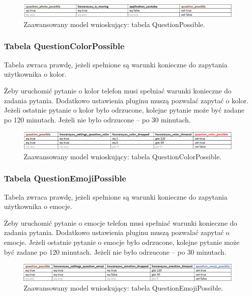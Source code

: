\begin{figure}[H]
	\centering
	\includegraphics[scale=0.75]{rozdzial4/HMR_QuestionPossible.png}
	\caption{Zaawansowany model wnioskujący: tabela QuestionPossible.}
\end{figure}


\subsubsection{Tabela QuestionColorPossible}

Tabela zwraca prawdę, jeżeli spełnione są warunki konieczne do zapytania użytkownika o kolor.

Żeby uruchomić pytanie o kolor telefon musi spełniać warunki konieczne do zadania pytania. Dodatkowo ustawienia pluginu muszą pozwalać zapytać o kolor. Jeżeli ostatnie pytanie o kolor było odrzucone, kolejne pytanie może być zadane po 120 minutach. Jeżeli nie było odrzucone – po 30 minutach.

\begin{figure}[H]
	\centering
	\includegraphics[scale=0.75]{rozdzial4/HMR_QuestionColorPossible.png}
	\caption{Zaawansowany model wnioskujący: tabela QuestionColorPossible.}
\end{figure}


\subsubsection{Tabela QuestionEmojiPossible}

Tabela zwraca prawdę, jeżeli spełnione są warunki konieczne do zapytania użytkownika o emocje.

Żeby uruchomić pytanie o emocje telefon musi spełniać warunki konieczne do zadania pytania. Dodatkowo ustawienia pluginu muszą pozwalać zapytać o emocje. Jeżeli ostatnie pytanie o emocje było odrzucone, kolejne pytanie może być zadane po 120 minutach. Jeżeli nie było odrzucone – po 30 minutach.

\begin{figure}[H]
	\centering
	\includegraphics[scale=0.75]{rozdzial4/HMR_QuestionEmojiPossible.png}
	\caption{Zaawansowany model wnioskujący: tabela QuestionEmojiPossible.}
\end{figure}


